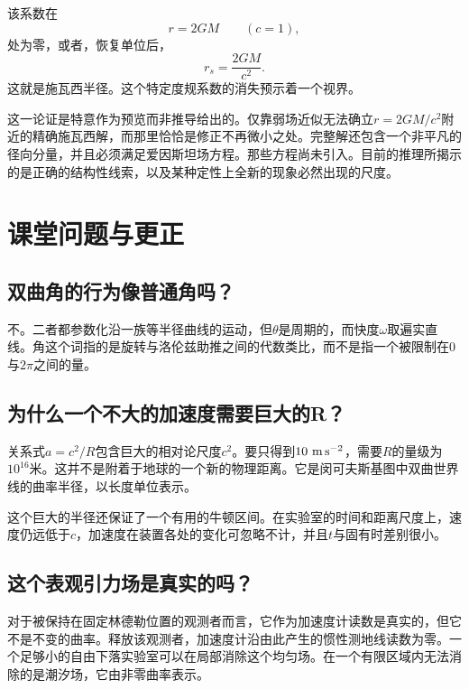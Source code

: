 该系数在
\begin{equation}
r=2GM
\qquad(c=1),
\end{equation}
处为零，或者，恢复单位后，
\begin{equation}
r_s=\frac{2GM}{c^2}.
\end{equation}
这就是施瓦西半径。这个特定度规系数的消失预示着一个视界。

这一论证是特意作为预览而非推导给出的。仅靠弱场近似无法确立\(r=2GM/c^2\)附近的精确施瓦西解，而那里恰恰是修正不再微小之处。完整解还包含一个非平凡的径向分量，并且必须满足爱因斯坦场方程。那些方程尚未引入。目前的推理所揭示的是正确的结构性线索，以及某种定性上全新的现象必然出现的尺度。

\section{课堂问题与更正}

\subsection{双曲角的行为像普通角吗？}

不。二者都参数化沿一族等半径曲线的运动，但\(\theta\)是周期的，而快度\(\omega\)取遍实直线。角这个词指的是旋转与洛伦兹助推之间的代数类比，而不是指一个被限制在\(0\)与\(2\pi\)之间的量。

\subsection{为什么一个不大的加速度需要巨大的R？}

关系式\(a=c^2/R\)包含巨大的相对论尺度\(c^2\)。要只得到\(10\ {\rm m\,s^{-2}}\)，需要\(R\)的量级为\(10^{16}\)米。这并不是附着于地球的一个新的物理距离。它是闵可夫斯基图中双曲世界线的曲率半径，以长度单位表示。

这个巨大的半径还保证了一个有用的牛顿区间。在实验室的时间和距离尺度上，速度仍远低于\(c\)，加速度在装置各处的变化可忽略不计，并且\(t\)与固有时差别很小。

\subsection{这个表观引力场是真实的吗？}

对于被保持在固定林德勒位置的观测者而言，它作为加速度计读数是真实的，但它不是不变的曲率。释放该观测者，加速度计沿由此产生的惯性测地线读数为零。一个足够小的自由下落实验室可以在局部消除这个均匀场。在一个有限区域内无法消除的是潮汐场，它由非零曲率表示。

